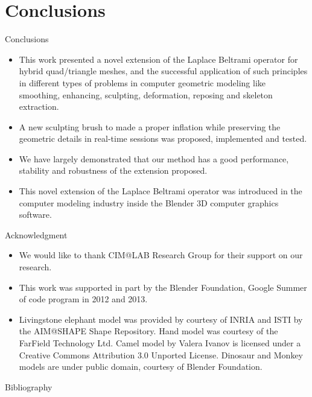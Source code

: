 \documentclass[10pt, compress, english]{beamer}
\begin{document}
\section{Conclusions}
\begin{frame}{Conclusions}

\begin{itemize}
\item This work presented a novel extension of the Laplace Beltrami operator
for hybrid quad/triangle meshes, and the successful application of
such principles in different types of problems in computer geometric
modeling like smoothing, enhancing, sculpting, deformation, reposing
and skeleton extraction.
\pause{}
\item A new sculpting brush to made a proper inflation while preserving
the geometric details in real-time sessions was proposed, implemented
and tested.
\pause{}
\item We have largely demonstrated that our method has a good performance,
stability and robustness of the extension proposed.
\pause{}
\item This novel extension of the Laplace Beltrami operator was introduced
in the computer modeling industry inside the Blender 3D computer graphics
software.
\end{itemize}
\end{frame}

\begin{frame}{Acknowledgment}

\begin{itemize}
\item We would like to thank CIM@LAB Research Group for their support on
our research.
\item This work was supported in part by the Blender Foundation, Google
Summer of code program in 2012 and 2013. 
\item Livingstone elephant model was provided by courtesy of INRIA and ISTI
by the AIM@SHAPE Shape Repository. Hand model was courtesy of the FarField
Technology Ltd. Camel model by Valera Ivanov is licensed under a Creative
Commons Attribution 3.0 Unported License. Dinosaur and Monkey models
are under public domain, courtesy of Blender Foundation.
\end{itemize}

\end{frame}

 \begin{frame}[allowframebreaks]{Bibliography}


{\scriptsize{}
\nocite{*}

}{\scriptsize \par}

\end{frame}
 

 
\end{document}
